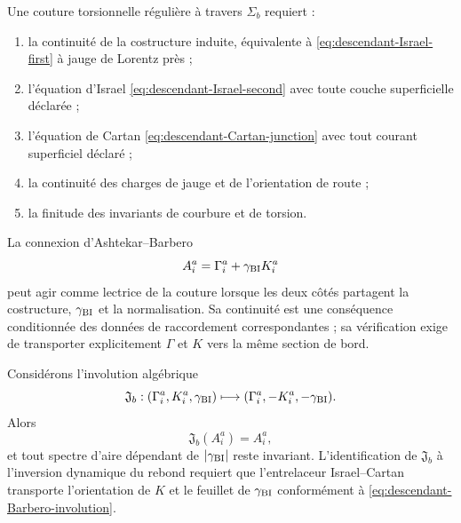 \begin{criterion}
\label{crit:descendant-Israel-Cartan}
Une couture torsionnelle régulière à travers \(\Sigma_b\) requiert :
\begin{enumerate}[label=\roman*)]
 \item la continuité de la costructure induite, équivalente à
       \cref{eq:descendant-Israel-first} à jauge de Lorentz près ;
 \item l'équation d'Israel \cref{eq:descendant-Israel-second} avec toute couche
       superficielle déclarée ;
 \item l'équation de Cartan \cref{eq:descendant-Cartan-junction} avec tout
       courant superficiel déclaré ;
 \item la continuité des charges de jauge et de l'orientation de route ;
 \item la finitude des invariants de courbure et de torsion.
\end{enumerate}
\end{criterion}

La connexion d'Ashtekar--Barbero
\begin{equation}
 A_i^a=\Gamma_i^a+\gamma_{\rm BI}K_i^a
 \label{eq:descendant-Barbero-connection}
\end{equation}
peut agir comme lectrice de la couture lorsque les deux côtés partagent
la costructure, \(\gamma_{\rm BI}\) et la normalisation. Sa continuité est une
conséquence conditionnée des données de raccordement correspondantes ; sa
vérification exige de transporter explicitement \(\Gamma\) et \(K\) vers la
même section de bord.

\begin{proposition}
\label{prop:descendant-Barbero-involution}
Considérons l'involution algébrique
\begin{equation}
 \mathfrak J_b:
 (\Gamma_i^a,K_i^a,\gamma_{\rm BI})
 \longmapsto
 (\Gamma_i^a,-K_i^a,-\gamma_{\rm BI}).
 \label{eq:descendant-Barbero-involution}
\end{equation}
Alors
\begin{equation}
 \mathfrak J_b(A_i^a)=A_i^a,
 \label{eq:descendant-Barbero-A-invariant}
\end{equation}
et tout spectre d'aire dépendant de \(|\gamma_{\rm BI}|\) reste
invariant. L'identification de \(\mathfrak J_b\) à l'inversion
dynamique du rebond requiert que l'entrelaceur Israel--Cartan transporte
l'orientation de \(K\) et le feuillet de \(\gamma_{\rm BI}\) conformément à
\cref{eq:descendant-Barbero-involution}.
\end{proposition}

